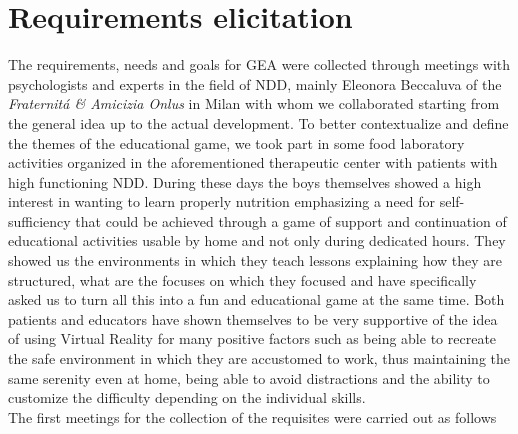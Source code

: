 \section{Requirements elicitation}
The requirements, needs and goals for GEA were collected through meetings with psychologists and experts in the field of NDD, mainly Eleonora Beccaluva of the \textit{Fraternit\'a \& Amicizia Onlus} in Milan with whom we collaborated starting from the general idea up to the actual development. To better contextualize and define the themes of the educational game, we took part in some food laboratory activities organized in the aforementioned therapeutic center with patients with high functioning NDD. During these days the boys themselves showed a high interest in wanting to learn properly nutrition emphasizing a need for self-sufficiency that could be achieved through a game of support and continuation of educational activities usable by home and not only during dedicated hours. They showed us the environments in which they teach lessons explaining how they are structured, what are the focuses on which they focused and have specifically asked us to turn all this into a fun and educational game at the same time. Both patients and educators have shown themselves to be very supportive of the idea of using Virtual Reality for many positive factors such as being able to recreate the safe environment in which they are accustomed to work, thus maintaining the same serenity even at home, being able to avoid distractions and the ability to customize the difficulty depending on the individual skills.\\
The first meetings for the collection of the requisites were carried out as follows
